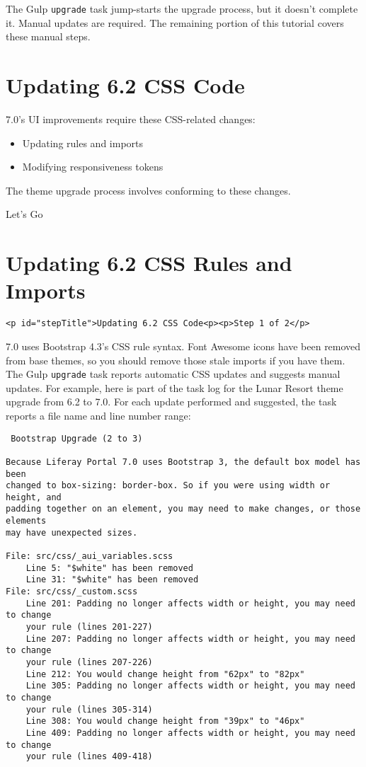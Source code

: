 The Gulp \texttt{upgrade} task jump-starts the upgrade process, but it
doesn't complete it. Manual updates are required. The remaining portion
of this tutorial covers these manual steps.

\chapter{Updating 6.2 CSS Code}\label{updating-6.2-css-code}

7.0's UI improvements require these CSS-related changes:

\begin{itemize}
\tightlist
\item
  Updating rules and imports
\item
  Modifying responsiveness tokens
\end{itemize}

The theme upgrade process involves conforming to these changes.

Let's Go{}

\chapter{Updating 6.2 CSS Rules and
Imports}\label{updating-6.2-css-rules-and-imports}

\begin{verbatim}
<p id="stepTitle">Updating 6.2 CSS Code<p><p>Step 1 of 2</p>
\end{verbatim}

7.0 uses Bootstrap 4.3's CSS rule syntax. Font Awesome icons have been
removed from base themes, so you should remove those stale imports if
you have them. The Gulp \texttt{upgrade} task reports automatic CSS
updates and suggests manual updates. For example, here is part of the
task log for the Lunar Resort theme upgrade from 6.2 to 7.0. For each
update performed and suggested, the task reports a file name and line
number range:

\begin{verbatim}
 Bootstrap Upgrade (2 to 3)

Because Liferay Portal 7.0 uses Bootstrap 3, the default box model has been 
changed to box-sizing: border-box. So if you were using width or height, and 
padding together on an element, you may need to make changes, or those elements 
may have unexpected sizes.

File: src/css/_aui_variables.scss
    Line 5: "$white" has been removed
    Line 31: "$white" has been removed
File: src/css/_custom.scss
    Line 201: Padding no longer affects width or height, you may need to change 
    your rule (lines 201-227)
    Line 207: Padding no longer affects width or height, you may need to change 
    your rule (lines 207-226)
    Line 212: You would change height from "62px" to "82px"
    Line 305: Padding no longer affects width or height, you may need to change 
    your rule (lines 305-314)
    Line 308: You would change height from "39px" to "46px"
    Line 409: Padding no longer affects width or height, you may need to change 
    your rule (lines 409-418)
\end{verbatim}

